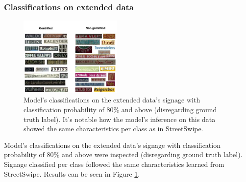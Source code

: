 \subsubsection{Classifications on extended data}

\begin{figure}[h!]
    \centering
    \includegraphics[width=0.45\textwidth]{media/results/output_vis-pano.jpg}
    \caption{Model's classifications on the extended data's signage with classification probability of 80\% and above (disregarding ground truth label). It's notable how the model's inference on this data showed the same characteristics per class as in StreetSwipe.}
    \label{fig:output_vis_pano}
\end{figure}

Model's classifications on the extended data's signage with classification probability of 80\% and above were inspected (disregarding ground truth label). Signage classified per class followed the same characteristics learned from StreetSwipe. Results can be seen in Figure \ref{fig:output_vis_pano}.


